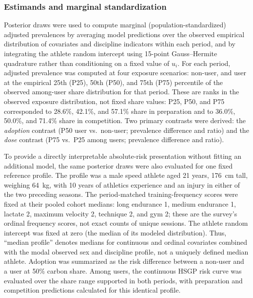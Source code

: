 \subsubsection{Estimands and marginal standardization}
\label{sec:estimands}
Posterior draws were used to compute marginal (population-standardized) adjusted prevalences by averaging model predictions over the observed empirical distribution of covariates and discipline indicators within each period, and by integrating the athlete random intercept using 15-point Gauss--Hermite quadrature rather than conditioning on a fixed value of $u_i$. For each period, adjusted prevalence was computed at four exposure scenarios: non-user, and user at the empirical 25th (P25), 50th (P50), and 75th (P75) percentile of the observed among-user share distribution for that period. These are ranks in the observed exposure distribution, not fixed share values: P25, P50, and P75 corresponded to 28.6\%, 42.1\%, and 57.1\% share in preparation and to 36.0\%, 50.0\%, and 71.4\% share in competition. Two primary contrasts were derived: the \emph{adoption} contrast (P50 user vs.\ non-user; prevalence difference and ratio) and the \emph{dose} contrast (P75 vs.\ P25 among users; prevalence difference and ratio).

To provide a directly interpretable absolute-risk presentation without fitting an additional model, the same posterior draws were also evaluated for one fixed reference profile. The profile was a male speed athlete aged 21 years, 176~cm tall, weighing 64~kg, with 10 years of athletics experience and an injury in either of the two preceding seasons. The period-matched training-frequency scores were fixed at their pooled cohort medians: long endurance 1, medium endurance 1, lactate 2, maximum velocity 2, technique 2, and gym 2; these are the survey's ordinal frequency scores, not exact counts of unique sessions. The athlete random intercept was fixed at zero (the median of its modeled distribution). Thus, ``median profile'' denotes medians for continuous and ordinal covariates combined with the modal observed sex and discipline profile, not a uniquely defined median athlete. Adoption was summarized as the risk difference between a non-user and a user at 50\% carbon share. Among users, the continuous HSGP risk curve was evaluated over the share range supported in both periods, with preparation and competition predictions calculated for this identical profile.

